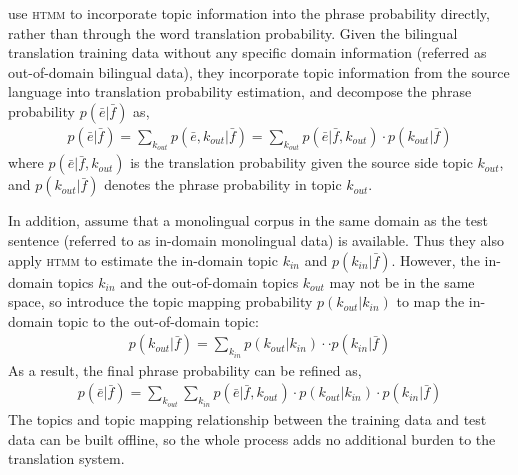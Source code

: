 

\citet{su-12} use \textsc{htmm} to incorporate topic information
into the phrase probability directly, rather than through the word
translation probability.
Given the bilingual translation
training data without any specific domain information (referred as
out-of-domain bilingual data), they incorporate topic information
from the source language into translation probability estimation, and
decompose the phrase probability $p(\bar{e}|\bar{f})$ as,
\begin{align}
p(\bar{e}|\bar{f}) = \sum_{k_{out}} p(\bar{e}, k_{out} | \bar{f}) = \sum_{k_{out}} p(\bar{e} | \bar{f}, k_{out}) \cdot p(k_{out} | \bar{f})
\end{align}
where $p(\bar{e} | \bar{f}, k_{out})$ is the translation probability given the source side topic $k_{out}$, and $p(k_{out} | \bar{f})$ denotes the phrase probability in topic $k_{out}$.

In addition, \citet{su-12} assume that a monolingual corpus in the
same domain as the test sentence (referred to as in-domain monolingual
data) is available. Thus they also apply \textsc{htmm} to estimate the
in-domain topic $k_{in}$ and $p(k_{in} | \bar{f})$.  However, the
in-domain topics $k_{in}$ and the out-of-domain topics $k_{out}$ may
not be in the same space, so \citet{su-12} introduce the topic mapping
probability $p(k_{out} | k_{in})$ to map the in-domain topic to the
out-of-domain topic:
\begin{align}
p(k_{out} | \bar{f}) = \sum_{k_{in}} p(k_{out} | k_{in}) \cdot \cdot p(k_{in} | \bar{f})
\end{align}
As a result, the final phrase probability can be refined as,
\begin{align}
p(\bar{e}|\bar{f}) = \sum_{k_{out}} \sum_{k_{in}} p(\bar{e} | \bar{f}, k_{out}) \cdot p(k_{out} | k_{in}) \cdot p(k_{in} | \bar{f})
\end{align}
The topics and topic mapping relationship
between the training data and test data can be built offline, so the
whole process adds no additional burden to the translation system.

